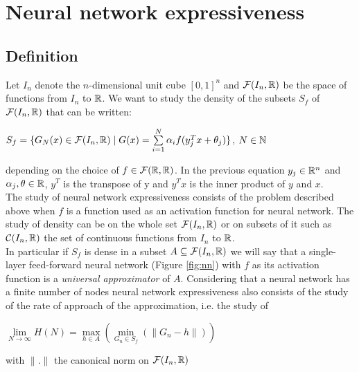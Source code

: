 \documentclass[12pt, a4paper]{article}
\begin{document}
\section{Neural network expressiveness}

\label{sec:nn_express}

\subsection{Definition}

Let $I_n$ denote the $n$-dimensional unit cube $[0,1]^n$ and $\mathcal{F}(I_n,\mathbb{R})$ be the space of functions from $I_n$ to $\mathbb{R}$. We want to study the density of the subsets $S_f$ of $\mathcal{F}(I_n,\mathbb{R})$ that can be written:\\

\begin{center}
  $S_f = \{G_N(x) \in \mathcal{F}(I_n,\mathbb{R}) \mid G(x) = \sum\limits_{i=1}^{N} \alpha_i f(y_j^T x + \theta_j )\}$, $N \in \mathbb{N} $
\end{center}

depending on the choice of $f \in \mathcal{F}(\mathbb{R},\mathbb{R})$. In the previous equation $y_j \in \mathbb{R}^n$ and $\alpha_j, \theta \in \mathbb{R}$, $y^T$ is the transpose of y and $y^Tx$ is the inner product of $y$ and $x$.\\

The study of neural network expressiveness consists of the problem described above when $f$ is a function used as an activation function for neural network. The study of density can be on the whole set $\mathcal{F}(I_n,\mathbb{R})$ or on subsets of it such as $\mathcal{C}(I_n,\mathbb{R})$ the set of continuous functions from $I_n$ to $\mathbb{R}$.\\

In particular if $S_f$ is dense in a subset $A \subseteq \mathcal{F}(I_n, \mathbb{R})$ we will say that a single-layer feed-forward neural network (Figure \ref{fig:nn}) with $f$ as its activation function is a \textit{universal approximator} of $A$. Considering that a neural network has a finite number of nodes neural network expressiveness also consists of the study of the rate of approach of the approximation, i.e. the study of \\

\begin{center}
  $\lim\limits_{N \to \infty} H(N) = \max\limits_{h\in A} (\min\limits_{G_n \in S_f} (\parallel G_n - h \parallel))$ 
\end{center}

with $\parallel . \parallel$ the canonical norm on $\mathcal{F}(I_n, \mathbb{R})$\\
\end{document}
